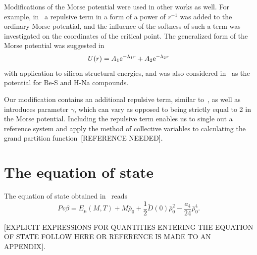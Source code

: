 \documentclass[12pt]{article}
\begin{document}
	Modifications of the Morse potential were used in other works as well. For example, in~\cite{MartinezValenciaEtAl2013} a repulsive term in a form of a power of $r^{-1}$ was added to the ordinary Morse potential, and the influence of the softness of such a term was investigated on the coordinates of the critical point. The generalized form of the Morse potential was suggested in~\cite{BiswasHamann1985}
	\begin{equation}
		U(r) = A_1 {\rm e}^{-\lambda_1 r} + A_2 {\rm e}^{-\lambda_2 r}
	\end{equation} 
	with application to silicon structural energies, and was also considered in~\cite{Lim2005} as the potential for Be-S and H-Na compounds.
	
	Our modification contains an additional repulsive term, similar to~\cite{MartinezValenciaEtAl2013}, as well as introduces parameter $\gamma$, which can vary as opposed to being strictly equal to 2 in the Morse potential. Including the repulsive term enables us to single out a reference system and apply the method of collective variables to calculating the grand partition function~[REFERENCE NEEDED].
	
	\section{The equation of state}
	The equation of state obtained in~\cite{KozlovskiiDobush2020} reads
	\begin{equation}
		\label{eq:eos}
		Pv\beta = E_\mu(M, T) + M \bar \rho_0 + \frac{1}{2} \tilde D(0) \bar \rho_0^2 - \frac{a_4}{24} \bar \rho_0^4.
	\end{equation}
	
	[EXPLICIT EXPRESSIONS FOR QUANTITIES ENTERING THE EQUATION OF STATE FOLLOW HERE OR REFERENCE IS MADE TO AN APPENDIX].
	
\end{document}

